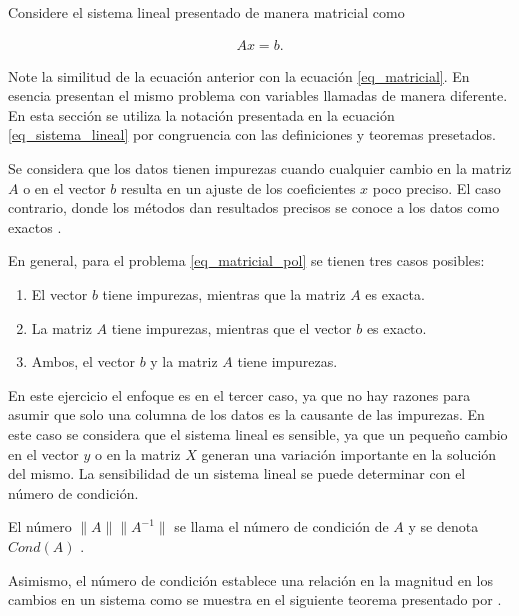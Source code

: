 Considere el sistema lineal presentado de manera matricial como 

\begin{equation}  \label{eq_sistema_lineal}
	\begin{aligned}
		Ax = b.
	\end{aligned}
\end{equation} 

Note la similitud de la ecuación anterior con la ecuación \ref{eq_matricial}. En esencia presentan el mismo problema con variables llamadas de manera diferente. En esta sección se utiliza la notación presentada en la ecuación \ref{eq_sistema_lineal} por congruencia con las definiciones y teoremas presetados. 

Se considera que los datos tienen impurezas cuando cualquier cambio en la matriz $A$ o en el vector $b$ resulta en un ajuste de los coeficientes $x$ poco preciso. El caso contrario, donde los métodos dan resultados precisos se conoce a los datos como exactos \cite{numerical_linear_algebra}.

En general, para el problema \ref{eq_matricial_pol} se tienen tres casos posibles: 
\begin{enumerate}
	\item El vector $b$ tiene impurezas, mientras que la matriz $A$ es exacta. 
	\item La matriz $A$ tiene impurezas, mientras que el vector $b$ es exacto.
	\item Ambos, el vector $b$ y la matriz $A$ tiene impurezas. 
\end{enumerate}

En este ejercicio el enfoque es en el tercer caso, ya que no hay razones para asumir que solo una columna de los datos es la causante de las impurezas. En este caso se considera que el sistema lineal es sensible, ya que un pequeño cambio en el vector $y$ o en la matriz $X$ generan una variación importante en la solución del mismo. La sensibilidad de un sistema lineal se puede determinar con el número de condición. 

\begin{definition}
	El número $\parallel A \parallel  \parallel A^{-1} \parallel$ se llama el número de condición de $A$ y se denota $Cond(A)$ \cite[p.~62]{numerical_linear_algebra}. 
\end{definition}

Asimismo, el número de condición establece una relación en la magnitud en los cambios en un sistema como se muestra en el siguiente teorema presentado por  \cite[p.~65]{numerical_linear_algebra}.


